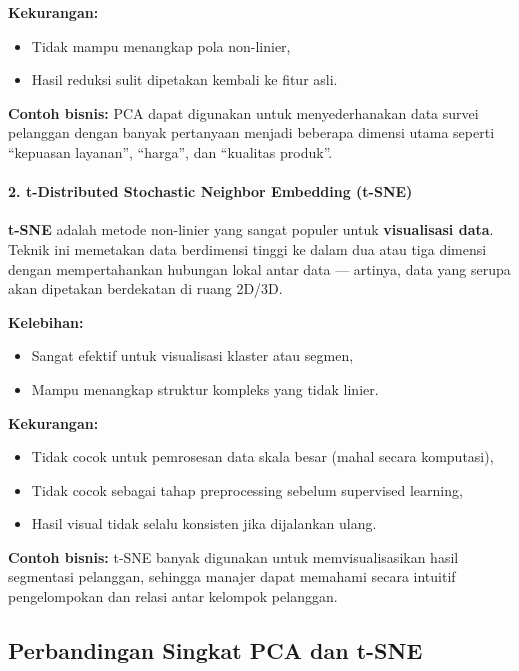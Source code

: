 \textbf{Kekurangan:}
\begin{itemize}
	\item Tidak mampu menangkap pola non-linier,
	\item Hasil reduksi sulit dipetakan kembali ke fitur asli.
\end{itemize}

\textbf{Contoh bisnis:} PCA dapat digunakan untuk menyederhanakan data survei pelanggan dengan banyak pertanyaan menjadi beberapa dimensi utama seperti “kepuasan layanan”, “harga”, dan “kualitas produk”.

\paragraph{2. t-Distributed Stochastic Neighbor Embedding (t-SNE)}

\textbf{t-SNE} adalah metode non-linier yang sangat populer untuk \textbf{visualisasi data}. Teknik ini memetakan data berdimensi tinggi ke dalam dua atau tiga dimensi dengan mempertahankan hubungan lokal antar data — artinya, data yang serupa akan dipetakan berdekatan di ruang 2D/3D.

\textbf{Kelebihan:}
\begin{itemize}
	\item Sangat efektif untuk visualisasi klaster atau segmen,
	\item Mampu menangkap struktur kompleks yang tidak linier.
\end{itemize}

\textbf{Kekurangan:}
\begin{itemize}
	\item Tidak cocok untuk pemrosesan data skala besar (mahal secara komputasi),
	\item Tidak cocok sebagai tahap preprocessing sebelum supervised learning,
	\item Hasil visual tidak selalu konsisten jika dijalankan ulang.
\end{itemize}

\textbf{Contoh bisnis:} t-SNE banyak digunakan untuk memvisualisasikan hasil segmentasi pelanggan, sehingga manajer dapat memahami secara intuitif pengelompokan dan relasi antar kelompok pelanggan.

\subsection*{Perbandingan Singkat PCA dan t-SNE}

